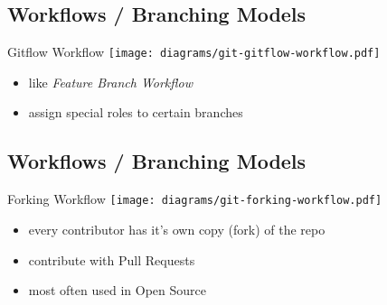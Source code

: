 \subsection{Workflows / Branching Models}
\begin{frame}[fragile]
  \subslidetitle
  Gitflow Workflow
  \center \texttt{[image: diagrams/git-gitflow-workflow.pdf]}

  \vspace{2em}
  \begin{itemize}
    \item like \textit{Feature Branch Workflow}
    \item assign special roles to certain branches
  \end{itemize}

\end{frame}

\subsection{Workflows / Branching Models}
\begin{frame}[fragile]
  \subslidetitle
  Forking Workflow
  \center \texttt{[image: diagrams/git-forking-workflow.pdf]}

  \vspace{2em}
  \begin{itemize}
    \item every contributor has it's own copy (fork) of the repo
    \item contribute with Pull Requests
    \item most often used in Open Source
  \end{itemize}

\end{frame}
